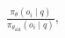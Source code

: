 \documentclass[preview]{standalone}
\begin{document}
\begin{align*}
\frac{\pi_\theta(o_i \mid q)}{\pi_{\theta_{\text{old}}}(o_i \mid q)},
\end{align*}
\end{document}
